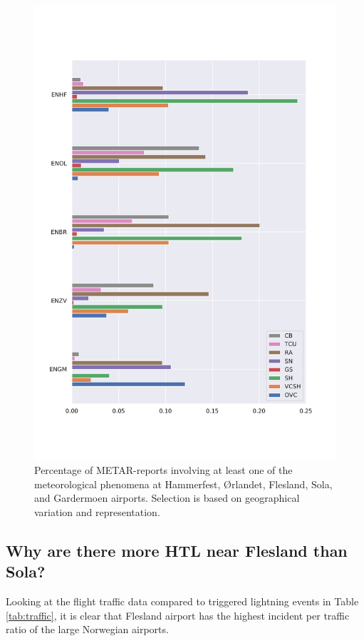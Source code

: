 \begin{figure}
    \centering
    \includegraphics[width=.9\textwidth]{Figures/METAR_airports.pdf}
    \caption{Percentage of METAR-reports involving at least one of the meteorological phenomena at Hammerfest, Ørlandet, Flesland, Sola, and Gardermoen airports. Selection is based on geographical variation and representation.}
    \label{fig:metarclimat}
\end{figure}


\subsection{Why are there more HTL near Flesland than Sola?}

Looking at the flight traffic data compared to triggered lightning events in Table \ref{tab:traffic}, it is clear that Flesland airport has the highest incident per traffic ratio of the large Norwegian airports. 

